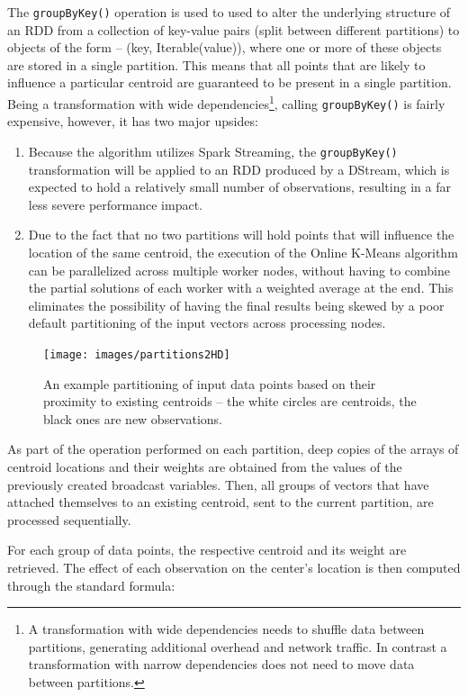 \documentclass{l4proj}
\begin{document}
The \texttt{groupByKey()} operation is used to used to alter the underlying structure of an RDD from a collection of key-value pairs (split between different partitions) to objects of the form -- (key, Iterable(value)), where one or more of these objects are stored in a single partition. This means that all points that are likely to influence a particular centroid are guaranteed to be present in a single partition. Being a transformation with wide dependencies\footnote{A transformation with wide dependencies needs to shuffle data between partitions, generating additional overhead and network traffic. In contrast a transformation with narrow dependencies does not need to move data between partitions.}, calling \texttt{groupByKey()} is fairly expensive, however, it has two major upsides:

\begin{enumerate}
\item Because the algorithm utilizes Spark Streaming, the \texttt{groupByKey()} transformation will be applied to an RDD produced by a DStream, which is expected to hold a relatively small number of observations, resulting in a far less severe performance impact.
\item Due to the fact that no two partitions will hold points that will influence the location of the same centroid, the execution of the Online K-Means algorithm can be parallelized across multiple worker nodes, without having to combine the partial solutions of each worker with a weighted average at the end. This eliminates the possibility of having the final results being skewed by a poor default partitioning of the input vectors across processing nodes. 
\end{enumerate}

\begin{figure}[H]
	\centering
    \label{partitions2}
    \texttt{[image: images/partitions2HD]}
    \caption{An example partitioning of input data points based on their proximity to existing centroids -- the white circles are centroids, the black ones are new observations.} 
\end{figure}

As part of the operation performed on each partition, deep copies of the arrays of centroid locations and their weights are obtained from the values of the previously created broadcast variables. Then, all groups of vectors that have attached themselves to an existing centroid, sent to the current partition, are processed sequentially.

For each group of data points, the respective centroid and its weight are retrieved. The effect of each observation on the center's location is then computed through the standard formula:
\end{document}
